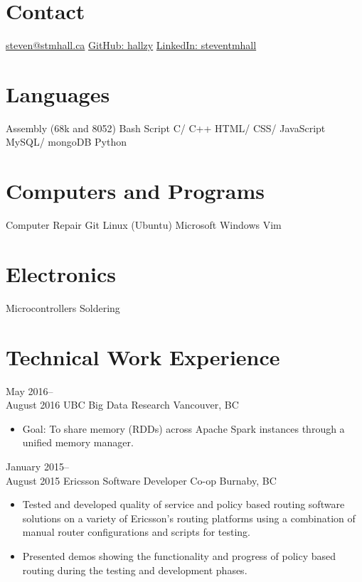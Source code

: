 \documentclass[]{friggeri-cv} %
\begin{document}


\begin{aside} %
\section{Contact}
\href{mailto:steven@stmhall.ca}{steven@stmhall.ca}
\href{http://github.com/hallzy}{GitHub: hallzy}
\href{https://www.linkedin.com/in/steventmhall}{LinkedIn: steventmhall}
\section{Languages}
Assembly (68k and 8052)
Bash Script
C/ C++
HTML/ CSS/ JavaScript
MySQL/ mongoDB
Python
\section{Computers and Programs}
Computer Repair
Git
Linux (Ubuntu)
Microsoft Windows
Vim
\section{Electronics}
Microcontrollers
Soldering
\end{aside}

\section{Technical Work Experience}

\begin{entrylist}

\entry
{May 2016--\\August 2016}
{UBC {\normalfont Big Data Research}}
{Vancouver, BC}
{
\begin{itemize}
\item Goal: To share memory (RDDs) across Apache Spark instances through a
unified memory manager.
\end{itemize}
}
\entry
{January 2015--\\August 2015}
{Ericsson {\normalfont Software Developer Co-op}}
{Burnaby, BC}
{
\begin{itemize}
\item Tested and developed quality of service and policy based routing software
solutions on a variety of Ericsson's routing platforms using a combination of
manual router configurations and scripts for testing.
\item Presented demos showing the functionality and progress of policy based
routing during the testing and development phases.
\end{itemize}
}
\end{entrylist}
\end{document}
